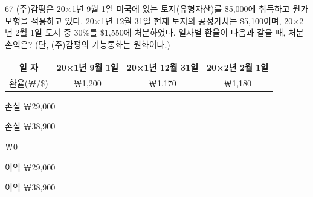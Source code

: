 \begin{question}{67}
(주)감평은 20×1년 9월 1일 미국에 있는 토지(유형자산)를 \$5,000에 취득하고 원가모형을 적용하고 있다. 20×1년 12월 31일 현재 토지의 공정가치는 \$5,100이며, 20×2년 2월 1일 토지 중 30\%를 \$1,550에 처분하였다. 일자별 환율이 다음과 같을 때, 처분손익은? (단, (주)감평의 기능통화는 원화이다.)
\par{\small\centering\begin{tabular}{|c|c|c|c|}\hline
일 자 & 20×1년 9월 1일 & 20×1년 12월 31일 & 20×2년 2월 1일 \\ \hline
환율(￦/\$) & ￦1,200 & ￦1,170 & ￦1,180 \\ \hline
\end{tabular}\par}
\begin{choices}
  \item 손실 ￦29,000
  \item 손실 ￦38,900
  \item ￦0
  \item 이익 ￦29,000
  \item 이익 ￦38,900
\end{choices}
\end{question}
